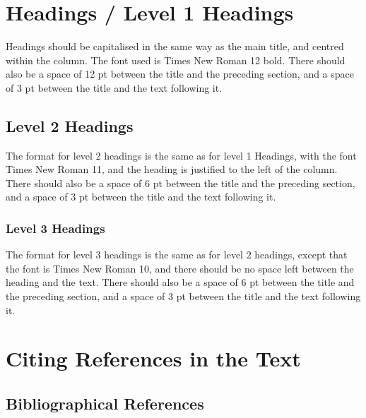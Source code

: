 \documentclass{article}
\begin{document}
\section{Headings / Level 1 Headings}

Headings should be capitalised in the same way as the main title, and centred
within the column. The font used is Times New Roman 12 bold. There should
also be a space of 12 pt between the title and the preceding section, and
a space of 3 pt between the title and the text following it.

\subsection{Level 2 Headings}

The format for level 2 headings is the same as for level 1 Headings, with the
font Times New Roman 11, and the heading is justified to the left of the column.
There should also be a space of 6 pt between the title and the preceding
section, and a space of 3 pt between the title and the text following it.

\subsubsection{Level 3 Headings}

The format for level 3 headings is the same as for level 2 headings, except that
the font is Times New Roman 10, and there should be no space left between the
heading and the text. There should also be a space of 6 pt between the title and
the preceding section, and a space of 3 pt between the title and the text
following it.

%

\section{Citing References in the Text}

\subsection{Bibliographical References}
\end{document}
